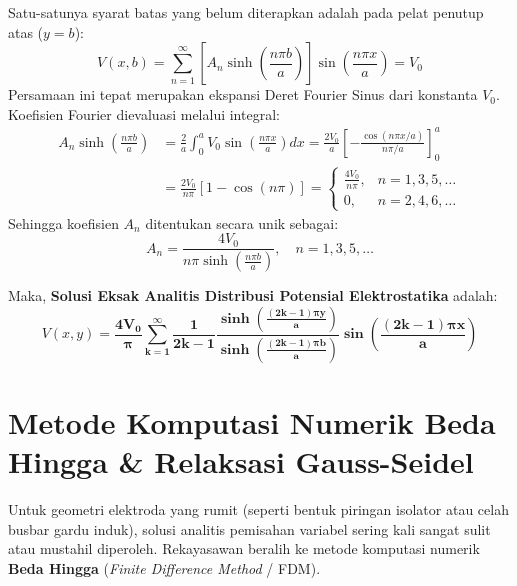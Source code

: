 \documentclass[11pt,a4paper]{article}
\theoremstyle{definition}
\begin{document}
Satu-satunya syarat batas yang belum diterapkan adalah pada pelat penutup atas ($y = b$):
\begin{equation}
    V(x, b) = \sum_{n=1}^{\infty} \left[ A_n \sinh\left(\frac{n\pi b}{a}\right) \right] \sin\left(\frac{n\pi x}{a}\right) = V_0
\end{equation}
Persamaan ini tepat merupakan ekspansi Deret Fourier Sinus dari konstanta $V_0$. Koefisien Fourier dievaluasi melalui integral:
\begin{align*}
    A_n \sinh\left(\frac{n\pi b}{a}\right) &= \frac{2}{a} \int_{0}^{a} V_0 \sin\left(\frac{n\pi x}{a}\right) dx = \frac{2V_0}{a} \left[ -\frac{\cos(n\pi x / a)}{n\pi / a} \right]_{0}^{a} \\
    &= \frac{2V_0}{n\pi} [1 - \cos(n\pi)] = \begin{cases} \frac{4V_0}{n\pi}, & n = 1, 3, 5, \dots \\ 0, & n = 2, 4, 6, \dots \end{cases}
\end{align*}
Sehingga koefisien $A_n$ ditentukan secara unik sebagai:
\begin{equation}
    A_n = \frac{4V_0}{n\pi \sinh\left(\frac{n\pi b}{a}\right)}, \quad n = 1, 3, 5, \dots
\end{equation}

Maka, \textbf{Solusi Eksak Analitis Distribusi Potensial Elektrostatika} adalah:
\begin{equation}
    V(x, y) = \mathbf{\frac{4V_0}{\pi} \sum_{k=1}^{\infty} \frac{1}{2k-1} \frac{\sinh\left(\frac{(2k-1)\pi y}{a}\right)}{\sinh\left(\frac{(2k-1)\pi b}{a}\right)} \sin\left(\frac{(2k-1)\pi x}{a}\right)}
    \label{eq:laplace_final_analytical}
\end{equation}

\section{Metode Komputasi Numerik Beda Hingga \& Relaksasi Gauss-Seidel}

Untuk geometri elektroda yang rumit (seperti bentuk piringan isolator atau celah busbar gardu induk), solusi analitis pemisahan variabel sering kali sangat sulit atau mustahil diperoleh. Rekayasawan beralih ke metode komputasi numerik \textbf{Beda Hingga} (\textit{Finite Difference Method} / FDM).
\end{document}
